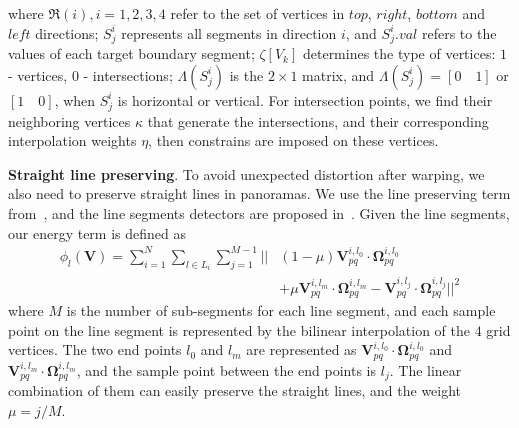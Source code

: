 \documentclass[10pt,journal,compsoc]{IEEEtran}
\begin{document}
where $\Re(i), i=1,2,3,4$ refer to the set of vertices in $top$, $right$, $bottom$ and $left$ directions;
$S^i_j$ represents all segments in direction $i$, and $S^i_j.val$ refers to the values of each target boundary segment;
$\zeta[V_k]$ determines the type of vertices: $1$ - vertices, $0$ - intersections;
$\Lambda(S^i_j)$ is the $2\times1$ matrix, and $\Lambda(S^i_j)=[0\quad 1] $ or $[1\quad 0]$, when $S^i_j$ is horizontal or vertical.
For intersection points, we find their neighboring vertices $\kappa$ that generate the intersections, and their corresponding interpolation weights $\eta$,
then constrains are imposed on these vertices.

\textbf{Straight line preserving}.
To avoid unexpected distortion after warping, we also need to preserve straight lines in panoramas.
We use the line preserving term from~\cite{journals/cgf/LinLCZ16}, and the line segments detectors are proposed in~\cite{journals/pami/GioiJMR10}.
Given the line segments, our energy term is defined as
\begin{equation} \label{equ:line_preserving}
\begin{split}
   \phi_l(\mathbf{V}) = \sum\limits_{i=1}^N\sum\limits_{l \in L_i}\sum\limits_{j=1}^{M-1}||&(1-\mu)\mathbf{V}^{i, l_0}_{pq} \cdot  \mathbf{\Omega}^{i, l_0}_{pq} \\
   &+ \mu \mathbf{V}^{i, l_m}_{pq} \cdot  \mathbf{\Omega}^{i, l_m}_{pq} -\mathbf{V}^{i, l_j}_{pq} \cdot  \mathbf{\Omega}^{i, l_j}_{pq}||^2
\end{split}
\end{equation}
where $M$ is the number of sub-segments for each line segment, and each sample point on the line segment is represented by the bilinear interpolation of the $4$ grid vertices. The two end points $l_0$ and $l_m$ are represented as $\mathbf{V}^{i, l_0}_{pq} \cdot  \mathbf{\Omega}^{i, l_0}_{pq}$ and $\mathbf{V}^{i, l_m}_{pq} \cdot  \mathbf{\Omega}^{i, l_m}_{pq}$, and the sample point between the end points is $l_j$.
The linear combination of them can easily preserve the straight lines, and the weight $\mu=j/M$.
\end{document}
